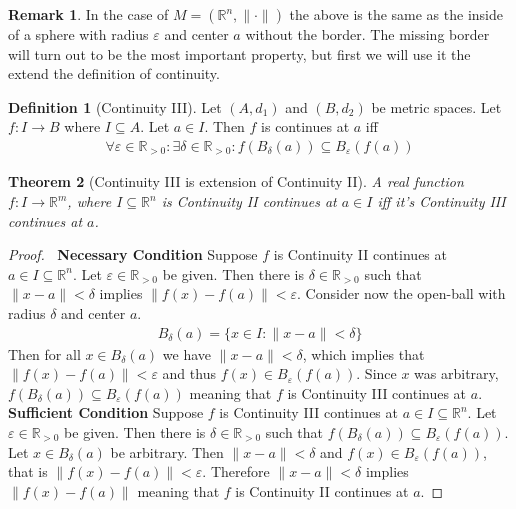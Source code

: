 \documentclass{article}
\theoremstyle{plain}
\newtheorem{theorem}{Theorem}
\theoremstyle{definition}
\newtheorem*{remark}{Remark}
\newtheorem{definition}[theorem]{Definition}
\newcommand{\R}{\mathbb{R}}
\begin{document}
\begin{remark}
	In the case of $M=(\R^n,\|\cdot\|)$ the above is the same as
	the inside of a sphere with radius $\varepsilon$ and center $a$
	without the border. The missing border will turn out to be the
	most important property, but first we will use it the extend
	the definition of continuity.
\end{remark}
\begin{definition}[Continuity III]
	Let $(A,d_1)$ and $(B,d_2)$ be metric spaces. Let $f:I\rightarrow B$ where
	$I\subseteq A$. Let $a\in I$. Then $f$ is continues at $a$ iff
	\begin{equation}
	\begin{aligned}
		\forall\varepsilon\in\R_{>0}:\exists\delta\in\R_{>0}:
		f(B_{\delta}(a))\subseteq B_{\varepsilon}(f(a))
	\end{aligned}
	\end{equation}
\end{definition}
\begin{theorem}[Continuity III is extension of Continuity II]
	A real function $f:I\rightarrow\R^m$, where $I\subseteq\R^n$
	is Continuity II continues at $a\in I$ iff it's Continuity III
	continues at $a$.
\end{theorem}
\begin{proof}$\ $\newline
	\textbf{Necessary Condition}\newline
	Suppose $f$ is Continuity II continues at $a\in
	I\subseteq\R^n$. Let $\varepsilon\in\R_{>0}$ be given.
	Then there is $\delta\in\R_{>0}$ such that $\|x-a\|<\delta$
	implies $\|f(x)-f(a)\|<\varepsilon$. Consider now the open-ball
	with radius $\delta$ and center $a$.
	\begin{equation}
	\begin{aligned}
		B_{\delta}(a)=\{x\in I:\|x-a\|<\delta\}
	\end{aligned}
	\end{equation}
	Then for all $x\in B_{\delta}(a)$ we have $\|x-a\|<\delta$, which implies
	that $\|f(x)-f(a)\|<\varepsilon$ and thus $f(x)\in B_{\varepsilon}(f(a))$.
	Since $x$ was arbitrary, $f(B_{\delta}(a))\subseteq B_{\varepsilon}(f(a))$
	meaning that $f$ is Continuity III continues at $a$.
	\newline\newline
\textbf{Sufficient Condition}\newline
	Suppose $f$ is Continuity III continues at $a\in
	I\subseteq\R^n$. Let $\varepsilon\in\R_{>0}$ be given.	Then there
	is $\delta\in\R_{>0}$ such that $f(B_{\delta}(a))\subseteq
	B_{\varepsilon}(f(a))$. Let $x\in B_{\delta}(a)$ be arbitrary. Then
	$\|x-a\|<\delta$ and $f(x)\in B_{\varepsilon}(f(a))$, that is
	$\|f(x)-f(a)\|<\varepsilon$. Therefore $\|x-a\|<\delta$ implies
	$\|f(x)-f(a)\|$ meaning that $f$ is Continuity II continues at $a$.
\end{proof}
\end{document}

